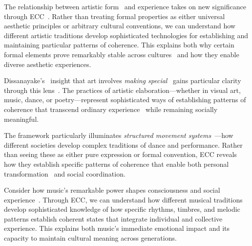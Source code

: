 The relationship between artistic form~ and experience takes on new significance through ECC~\cite{kaeppler1985structured,marchand2010making}. Rather than treating formal properties as either universal aesthetic principles or arbitrary cultural conventions, we can understand how different artistic traditions develop sophisticated technologies for establishing and maintaining particular patterns of coherence. This explains both why certain formal elements prove remarkably stable across cultures~ and how they enable diverse aesthetic experiences.

Dissanayake's~\cite{dissanayake1992homo} insight that art involves \textit{making special}~ gains particular clarity through this lens~\cite{coote1992anthropology}. The practices of artistic elaboration—whether in visual art, music, dance, or poetry—represent sophisticated ways of establishing patterns of coherence that transcend ordinary experience~ while remaining socially meaningful.

The framework particularly illuminates \textit{structured movement systems}~\cite{kaeppler1985structured,mcneill1995keeping}—how different societies develop complex traditions of dance and performance. Rather than seeing these as either pure expression or formal convention, ECC reveals how they establish specific patterns of coherence that enable both personal transformation~ and social coordination.

Consider how music's remarkable power shapes consciousness and social experience~\cite{feld1982sound,rouget1985music}. Through ECC, we can understand how different musical traditions develop sophisticated knowledge of how specific rhythms, timbres, and melodic patterns establish coherent states that integrate individual and collective experience. This explains both music's immediate emotional impact and its capacity to maintain cultural meaning across generations.

